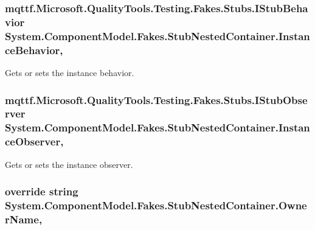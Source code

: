 \hypertarget{class_system_1_1_component_model_1_1_fakes_1_1_stub_nested_container_a1e3e4e8c2981745f8e9356c401984179}{
\subsubsection[{Instance\-Behavior}]{\setlength{\rightskip}{0pt plus 5cm}mqttf.\-Microsoft.\-Quality\-Tools.\-Testing.\-Fakes.\-Stubs.\-I\-Stub\-Behavior System.\-Component\-Model.\-Fakes.\-Stub\-Nested\-Container.\-Instance\-Behavior\hspace{0.3cm}{\ttfamily [get]}, {\ttfamily [set]}}}\label{class_system_1_1_component_model_1_1_fakes_1_1_stub_nested_container_a1e3e4e8c2981745f8e9356c401984179}


Gets or sets the instance behavior.

\hypertarget{class_system_1_1_component_model_1_1_fakes_1_1_stub_nested_container_a1975dbce58cd5b3fd133f0a1e8f8743e}{
\subsubsection[{Instance\-Observer}]{\setlength{\rightskip}{0pt plus 5cm}mqttf.\-Microsoft.\-Quality\-Tools.\-Testing.\-Fakes.\-Stubs.\-I\-Stub\-Observer System.\-Component\-Model.\-Fakes.\-Stub\-Nested\-Container.\-Instance\-Observer\hspace{0.3cm}{\ttfamily [get]}, {\ttfamily [set]}}}\label{class_system_1_1_component_model_1_1_fakes_1_1_stub_nested_container_a1975dbce58cd5b3fd133f0a1e8f8743e}


Gets or sets the instance observer.

\hypertarget{class_system_1_1_component_model_1_1_fakes_1_1_stub_nested_container_a049cca127cd42698fd319a4662c1d0a4}{
\subsubsection[{Owner\-Name}]{\setlength{\rightskip}{0pt plus 5cm}override string System.\-Component\-Model.\-Fakes.\-Stub\-Nested\-Container.\-Owner\-Name\hspace{0.3cm}{\ttfamily [get]}, {\ttfamily [protected]}}}\label{class_system_1_1_component_model_1_1_fakes_1_1_stub_nested_container_a049cca127cd42698fd319a4662c1d0a4}


